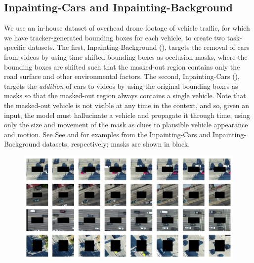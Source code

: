\subsection{Inpainting-Cars and Inpainting-Background}
We use an in-house dataset of overhead drone footage of vehicle traffic, for which we have tracker-generated bounding boxes for each vehicle, to create two task-specific datasets. The first, Inpainting-Background (), targets the removal of cars from videos by using time-shifted bounding boxes as occlusion masks, where the bounding boxes are shifted such that the masked-out region contains only the road surface and other environmental factors. The second, Inpainting-Cars (), targets the \emph{addition} of cars to videos by using the original bounding boxes as masks so that the masked-out region always contains a single vehicle. Note that the masked-out vehicle is not visible at any time in the context, and so,  given an input, the model must hallucinate a vehicle and propagate it through time, using only the size and movement of the mask as clues to plausible vehicle appearance and motion. See See  and  for examples from the Inpainting-Cars and Inpainting-Background datasets, respectively; masks are shown in black.
\begin{figure}
    \begin{center}
        \centering
        \captionsetup{type=figure}
        \includegraphics[width=\linewidth]{figures/dataset-examples/cars-examples.pdf}
        \label{fig:cars-examples}
    \end{center}
\end{figure}
